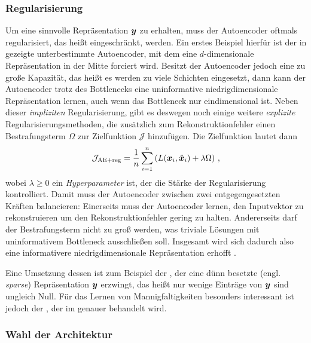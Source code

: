 \subsubsection{Regularisierung}
\label{ch:MethodenDerDimRed:ML:AE:Regularisierung}
Um eine sinnvolle Repräsentation $\bm{y}$ zu erhalten, muss der Autoencoder oftmals
regularisiert, das heißt eingeschränkt, werden. Ein erstes Beispiel hierfür ist der in
 gezeigte unterbestimmte Autoencoder, mit dem eine $d$-dimensionale
Repräsentation in der Mitte forciert wird. Besitzt der Autoencoder jedoch eine zu große Kapazität,
das heißt es werden zu viele Schichten eingesetzt, dann kann der Autoencoder trotz des Bottlenecks
eine uninformative niedrigdimensionale Repräsentation lernen, auch wenn das Bottleneck nur
eindimensional ist. Neben dieser \textit{impliziten} Regularisierung, gibt es deswegen noch einige
weitere \textit{explizite} Regularisierungsmethoden, die zusätzlich zum Rekonstruktionfehler einen
Bestrafungsterm $\Omega$ zur Zielfunktion $\mathcal{J}$ hinzufügen. Die Zielfunktion lautet dann
\begin{equation}
	\mathcal{J}_{\text{AE+reg}} = \frac{1}{n} \sum_{i = 1}^{n} \left( L(\bm{x}_i, \hat{\bm{x}}_i) + \lambda \Omega \right) \, ,
\end{equation}
wobei $\lambda \geq 0$ ein \textit{Hyperparameter} ist, der die Stärke der Regularisierung kontrolliert. Damit muss der Autoencoder zwischen zwei entgegengesetzten Kräften balancieren: Einerseits muss der Autoencoder lernen, den Inputvektor zu rekonstruieren um den Rekonstruktionfehler gering zu halten. Andererseits darf der Bestrafungsterm nicht zu groß werden, was triviale Lösungen mit uninformativem Bottleneck ausschließen soll. Insgesamt wird sich dadurch also eine informativere niedrigdimensionale Repräsentation erhofft \parencite[516]{Goodfellow.2016}.

Eine Umsetzung dessen ist zum Beispiel der , der eine dünn besetzte
(engl. \textit{sparse}) Repräsentation $\bm{y}$ erzwingt, das heißt nur wenige Einträge von
$\bm{y}$ sind ungleich Null. Für das Lernen von Mannigfaltigkeiten besonders interessant ist
jedoch der  \parencite{Rifai.2011}, der im  genauer behandelt wird.

\subsubsection{Wahl der Architektur}
\label{ch:MethodenDerDimRed:ML:AE:WahlArchitektur}

